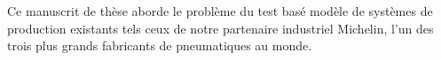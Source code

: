 Ce manuscrit de thèse aborde le problème du test basé modèle de
systèmes de production existants tels ceux de notre partenaire
industriel Michelin, l'un des trois plus grands fabricants de
pneumatiques au monde.
